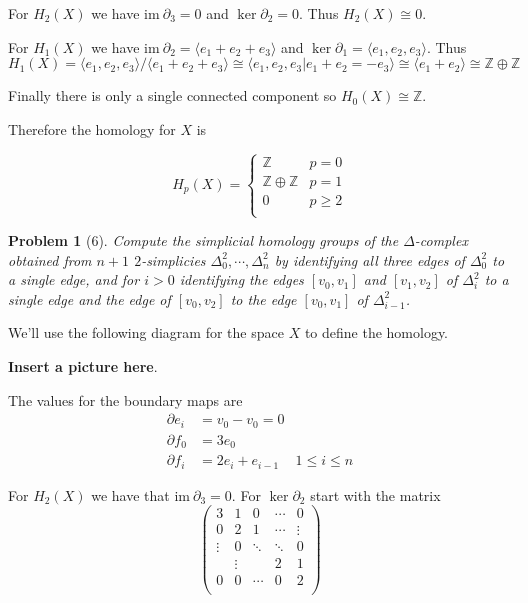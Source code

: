 \documentclass[10pt]{article}
\newcommand{\sk}{\vskip 10mm}
\newcommand{\bb}[1]{\mathbb{#1}}
\newcommand{\ima}{\mathrm{im}\ }
\theoremstyle{plain}
\newtheorem{problem}{Problem}
\theoremstyle{remark}
\begin{document}
For $H_2(X)$ we have $\ima \partial_3=0$ and $\ker\partial_2=0$. Thus
$H_2(X)\cong 0$.

For $H_1(X)$ we have $\ima \partial_2=\langle e_1+e_2+e_3\rangle$ and $\ker\partial_1=\langle e_1,e_2,e_3\rangle$.
Thus
\[ H_1(X)=\langle e_1,e_2,e_3\rangle/\langle e_1+e_2+e_3\rangle\cong\langle e_1,e_2,e_3|e_1+e_2=-e_3\rangle\cong\langle e_1+e_2\rangle\cong\bb{Z}\oplus\bb{Z}\]

Finally there is only a single connected component so $H_0(X)\cong\bb{Z}$.

Therefore the homology for $X$ is

\[
  H_p(X)=
  \left\{
    \begin{array}{ll}
      \bb{Z} & p=0\\
      \bb{Z}\oplus\bb{Z} & p=1\\
      0 & p\geq 2\\
    \end{array}
  \right.
\]

\sk

\begin{problem}[6]
  Compute the simplicial homology groups of the $\Delta$-complex obtained
  from $n+1$ $2$-simplicies $\Delta^2_0, \cdots, \Delta^2_n$ by identifying
  all three edges of $\Delta^2_0$ to a single edge, and for $i>0$ identifying
  the edges $[v_0,v_1]$ and $[v_1,v_2]$ of $\Delta^2_i$ to a single edge and
  the edge of $[v_0,v_2]$ to the edge $[v_0,v_1]$ of $\Delta^2_{i-1}$.
\end{problem}

We'll use the following diagram for the space $X$ to define the homology.

\textbf{Insert a picture here}.

The values for the boundary maps are
\begin{align*}
  \partial e_i &= v_0-v_0=0\\
  \partial f_0 &= 3e_0\\
  \partial f_i &= 2e_i+e_{i-1} & 1\leq i\leq n
\end{align*}

For $H_2(X)$ we have that $\ima \partial_3=0$. For $\ker \partial_2$ start with the matrix
\[
  \left(
    \begin{array}{ccccc}
      3&1&0&\cdots&0\\
      0&2&1&\cdots&\vdots\\
      \vdots&0&\ddots&\ddots&0\\
       &\vdots&&2&1\\
      0&0&\cdots&0&2\\
    \end{array}
  \right)
\]
\end{document}
